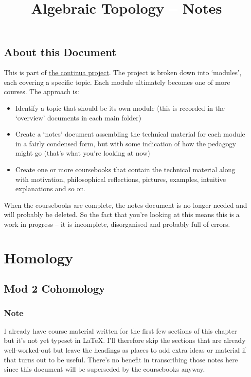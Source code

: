\documentclass[oneside,english]{amsbook}
\numberwithin{section}{chapter}
\theoremstyle{plain}
\theoremstyle{definition}
\begin{document}
	
	\title{Algebraic Topology -- Notes}
	
	\maketitle
	
	\tableofcontents
	
	\chapter*{About this Document}
	
	This is part of \href{https://github.com/FineArtMaths/continua}{the continua project}. The project is broken down into `modules', each covering a specific topic. Each module ultimately becomes one of more courses. The approach is:
	
	\begin{itemize}
		\item{Identify a topic that should be its own module (this is recorded in the `overview' documents in each main folder)}
		\item{Create a `notes' document assembling the technical material for each module in a fairly condensed form, but with some indication of how the pedagogy might go (that's what you're looking at now)}
		\item{Create one or more coursebooks that contain the technical material along with motivation, philosophical reflections, pictures, examples, intuitive explanations and so on.}
	\end{itemize}
	
	When the coursebooks are complete, the notes document is no longer needed and will probably be deleted. So the fact that you're looking at this means this is a work in progress -- it is incomplete, disorganised and probably full of errors.
	
	\part{Homology}
	
	\chapter{Mod 2 Cohomology}

	\section*{Note}

	I already have course material written for the first few sections of this chapter but it's not yet typeset in \LaTeX. I'll therefore skip the sections that are already well-worked-out but leave the headings as places to add extra ideas or material if that turns out to be useful. There's no benefit in transcribing those notes here since this document will be superseded by the coursebooks anyway. 
\end{document}
